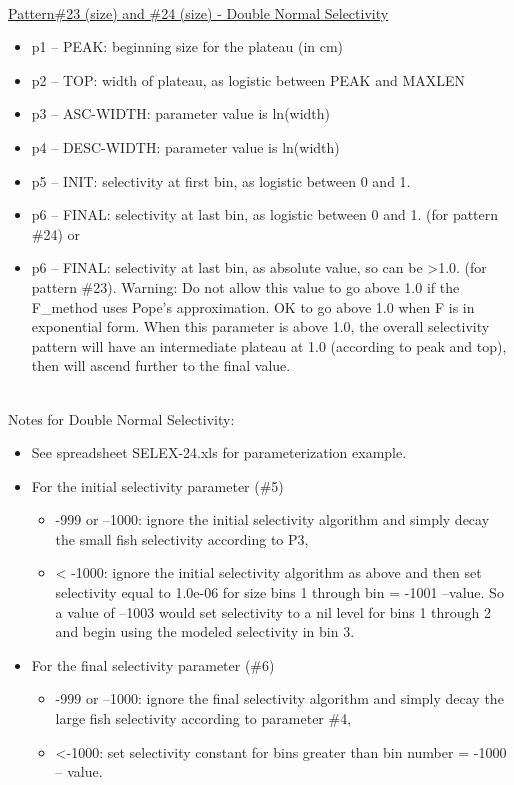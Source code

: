 \hfil
\\
\underline{Pattern\#23 (size) and \#24 (size) - Double Normal Selectivity}\\

\begin{itemize}
	\item p1 – PEAK:  beginning size for the plateau (in cm)
	\item p2 – TOP:  width of plateau, as logistic between PEAK and MAXLEN
	\item p3 – ASC-WIDTH:  parameter value is ln(width)
	\item p4 – DESC-WIDTH:  parameter value is ln(width)
	\item p5 – INIT:  selectivity at first bin, as logistic between 0 and 1.
	\item p6 – FINAL: selectivity at last bin, as logistic between 0 and 1.  (for pattern \#24) or
	\item p6 – FINAL: selectivity at last bin, as absolute value, so can be >1.0.  (for pattern \#23).  Warning:  Do not allow this value to go above 1.0 if the F\_method uses Pope’s approximation.  OK to go above 1.0 when F is in exponential form.  When this parameter is above 1.0, the overall selectivity pattern will have an intermediate plateau at 1.0 (according to peak and top), then will ascend further to the final value.
\end{itemize}
\hfil
\\
Notes for Double Normal Selectivity:
\begin{itemize}
		\item See spreadsheet SELEX-24.xls for parameterization example.
		\item For the initial selectivity parameter (\#5)
		\begin{itemize}
			\item -999 or –1000:   ignore the initial selectivity algorithm and simply decay the small fish selectivity according to P3,
			\item < -1000:  ignore the initial selectivity algorithm as above and then set selectivity equal to 1.0e-06 for size bins 1 through bin =  -1001 –value.  So a value of –1003 would set selectivity to a nil level for bins 1 through 2 and begin using the modeled selectivity in bin 3.
		\end{itemize}
		\item For the final selectivity parameter (\#6)
		\begin{itemize}
			\item -999 or –1000:   ignore the final selectivity algorithm and simply decay the large fish selectivity according to parameter \#4,
			\item <-1000:  set selectivity constant for bins greater than bin number =  -1000 – value.
		\end{itemize}
\end{itemize}
